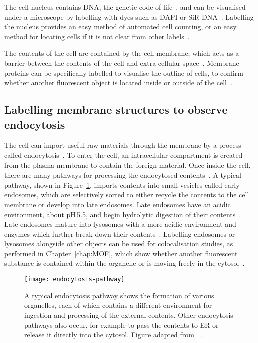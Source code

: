 The cell nucleus contains DNA, the genetic code of life~\cite{alberts2002molecular}, and can be visualised under a microscope by labelling with dyes such as DAPI or SiR-DNA~\cite{kapuscinski1995dapi, lukinavivcius2015sir}. 
Labelling the nucleus provides an easy method of automated cell counting, or an easy method for locating cells if it is not clear from other labels~\cite{porter1980use}. 

The contents of the cell are contained by the cell membrane, which acts as a barrier between the contents of the cell and extra-cellular space~\cite[\textit{ch. 1}]{alberts2013essential}. 
Membrane proteins can be specifically labelled to visualise the outline of cells, to confirm whether another fluorescent object is located inside or outside of the cell~\cite{yano2009tag, lee2011fluorescent, chamma2017optimized}. 

\subsection{Labelling membrane structures to observe endocytosis}
The cell can import useful raw materials through the membrane by a process called endocytosis~\cite{alberts2002molecular}. 
To enter the cell, an intracellular compartment is created from the plasma membrane to contain the foreign material.
Once inside the cell, there are many pathways for processing the endocytosed contents~\cite{marsh2001endocytosis, marsh1999structural, mcmahon2011molecular}. 
A typical pathway, shown in Figure~\ref{fig:endocytosis-pathway}, imports contents into small vesicles called early endosomes, which are selectively sorted to either recycle the contents to the cell membrane or develop into late endosomes. 
Late endosomes have an acidic environment, about pH\,\num{5.5}, and begin hydrolytic digestion of their contents~\cite{geisow1984ph}. 
Late endosomes mature into lysosomes with a more acidic environment and enzymes which further break down their contents~\cite{alberts2002molecular}. 
Labelling endosomes or lysosomes alongside other objects can be used for colocalisation studies, as performed in Chapter~\ref{chap:MOF}, which show whether another fluorescent substance is contained within the organelle or is moving freely in the cytosol~\cite{pike2017quantifying}. 

\begin{figure}[!b]
\centering
\texttt{[image: endocytosis-pathway]}
\captionsetup{singlelinecheck=off}
\caption[Introduction: Cells import external contents through endocytosis]{A typical endocytosis pathway shows the formation of various organelles, each of which contains a different environment for ingestion and processing of the external contents. Other endocytosis pathways also occur, for example to pass the contents to ER or release it directly into the cytosol. Figure adapted from ~\cite{alberts2002molecular}. } 
\label{fig:endocytosis-pathway}
\end{figure}

